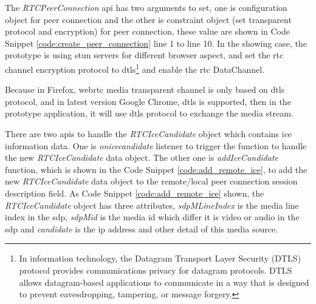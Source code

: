 \par The \textit{RTCPeerConnection} \gls{api} has two arguments to set, one is configuration object for peer connection and the other is constraint object (set transparent protocol and encryption) for peer connection, these value are shown in Code Snippet \ref{code:create_peer_connection} line 1 to line 10. In the showing case, the prototype is using \gls{stun} servers for different browser aspect, and set the \gls{rtc} channel encryption protocol to \gls{dtls}\footnote{In information technology, the Datagram Transport Layer Security (DTLS) protocol provides communications privacy for datagram protocols. DTLS allows datagram-based applications to communicate in a way that is designed to prevent eavesdropping, tampering, or message forgery.\cite{wiki:dtls}} and enable the \gls{rtc} DataChannel.

\par Because in Firefox, \gls{webrtc} media transparent channel is only based on \gls{dtls} protocol, and in latest version Google Chrome, \gls{dtls} is supported, then in the prototype application, it will use \gls{dtls} protocol to exchange the media stream.

\par There are two \gls{api}s to handle the \textit{RTCIceCandidate} object which contains \gls{ice} information data. One is \textit{onicecandidate} listener to trigger the function to handle the new \textit{RTCIceCandidate} data object. The other one is \textit{addIceCandidate} function, which is shown in the Code Snippet \ref{code:add_remote_ice}, to add the new \textit{RTCIceCandidate} data object to the remote/local peer connection session description field. As Code Snippet \ref{code:add_remote_ice} shown, the \textit{RTCIceCandidate} object has three attributes, \textit{sdpMLineIndex} is the media line index in the \gls{sdp}, \textit{sdpMid} is the media id which differ it is video or audio in the \gls{sdp} and \textit{candidate} is the \gls{ip} address and other detail of this media source.

